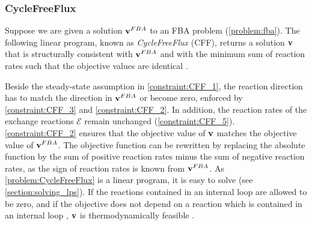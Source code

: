 
\subsubsection{CycleFreeFlux}
Suppose we are given a solution $\bold v^{FBA}$ to an FBA problem (\cref{problem:fba}). 
The following linear program, known as \textit{CycleFreeFlux} (CFF), returns a solution $\bold v$ that is structurally consistent with $\bold v^{FBA}$ and with the minimum sum of reaction rates such that the objective values are identical \cite{desouki_cyclefreeflux_2015-1}. 


Beside the steady-state assumption in \cref{constraint:CFF_1}, the reaction direction has to match the direction in $\bold v^{FBA}$ or become zero, enforced by \cref{constraint:CFF_3} and \cref{constraint:CFF_2}. In addition, the reaction rates of the exchange reactions $\mathcal{E}$ remain unchanged (\cref{constraint:CFF_5}).
\cref{constraint:CFF_2} ensures that the objective value of $\bold v$ matches the objective value of $\bold v^{FBA}$. The objective function can be rewritten by replacing the absolute function by the sum of positive reaction rates minus the sum of negative reaction rates, as the sign of reaction rates is known from $\bold v^{FBA}$. As \cref{problem:CycleFreeFlux} is a linear program, it is easy to solve (see \cref{section:solving_lps}). 
If the reactions contained in an internal loop are allowed to be zero, and  if the objective does not depend on a reaction which is contained in an internal loop%
, $\bold v$ is thermodynamically feasible \cite{noor_removing_2018}. 

